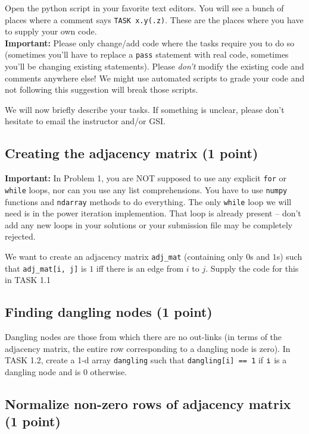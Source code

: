 \documentclass{article}
\begin{document}
Open the python script in your favorite text editors. You will see a bunch of places where a comment says {\tt TASK x.y(.z)}. These are the places where you have to supply your
own code.\\
{\bf Important:} Please only change/add code where the tasks require you to do so (sometimes you'll have to replace a {\tt pass} statement with real code, sometimes you'll be changing existing statements). Please {\em don't} modify the existing code and comments anywhere else! We might use automated scripts to grade your code and not following this suggestion will break those scripts.

We will now briefly describe your tasks. If something is unclear, please don't hesitate to email the instructor and/or GSI.

\subsection{Creating the adjacency matrix (1 point)}

{\bf Important:} In Problem 1, you are NOT supposed to use any explicit \verb#for# or \verb#while# loops, nor can you use any list comprehensions. You have to use \verb#numpy# functions and \verb#ndarray# methods to do everything. The only \verb#while# loop we will need is in the power iteration implemention. That loop is already present -- don't add any new loops in your solutions or your submission file may be completely rejected.

We want to create an adjacency matrix \verb#adj_mat# (containing only $0$s and $1$s) such that \verb#adj_mat[i, j]# is $1$ iff there is an edge from $i$ to $j$. Supply the code for this in TASK 1.1

\subsection{Finding  dangling nodes (1 point)}

Dangling nodes are those from which there are no out-links (in terms of the adjacency matrix, the entire row corresponding to a dangling node is zero). In TASK 1.2, create a 1-d array {\tt dangling} such that {\tt dangling[i] == 1} if ${\tt i}$ is a dangling node and is $0$ otherwise.

\subsection{Normalize non-zero rows of adjacency matrix (1 point)}
\end{document}

